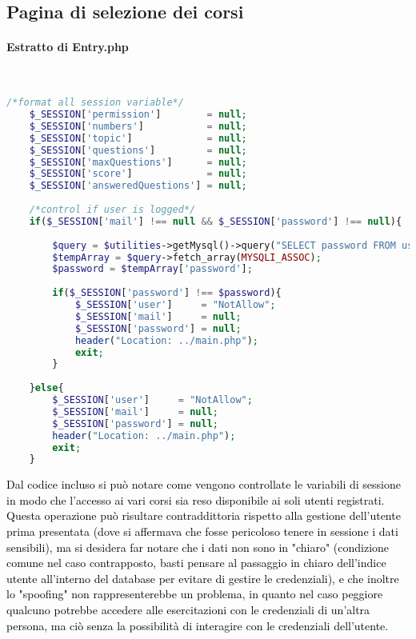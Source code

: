 
\subsection{Pagina di selezione dei corsi}

\paragraph{Estratto di Entry.php}\leavevmode\\

\begin{lstlisting}[language=php]
	/*format all session variable*/
	$_SESSION['permission']        = null;
	$_SESSION['numbers']           = null;
	$_SESSION['topic']             = null;
	$_SESSION['questions']         = null;
	$_SESSION['maxQuestions']      = null;
	$_SESSION['score']             = null;
	$_SESSION['answeredQuestions'] = null;
	
	/*control if user is logged*/
	if($_SESSION['mail'] !== null && $_SESSION['password'] !== null){
		
		$query = $utilities->getMysql()->query("SELECT password FROM user_table1 WHERE (email = '{$_SESSION['mail']}')");
		$tempArray = $query->fetch_array(MYSQLI_ASSOC);
		$password = $tempArray['password'];
		
		if($_SESSION['password'] !== $password){
			$_SESSION['user']     = "NotAllow";
			$_SESSION['mail']     = null;
			$_SESSION['password'] = null;
			header("Location: ../main.php");
			exit;
		}
		
	}else{
		$_SESSION['user']     = "NotAllow";
		$_SESSION['mail']     = null;
		$_SESSION['password'] = null;
		header("Location: ../main.php");
		exit;
	}
\end{lstlisting}

\raggedright
\textcolor{black}{Dal codice incluso si può notare come vengono controllate le variabili di sessione in modo che l'accesso ai vari corsi sia reso disponibile ai soli utenti registrati. Questa operazione può risultare contraddittoria rispetto alla gestione dell'utente prima presentata (dove si affermava che fosse pericoloso tenere in sessione i dati sensibili), ma si desidera far notare che i dati non sono in "chiaro" (condizione comune nel caso contrapposto, basti pensare al passaggio in chiaro dell'indice utente all'interno del database per evitare di gestire le credenziali), e che inoltre lo "spoofing" non rappresenterebbe un problema, in quanto nel caso peggiore qualcuno potrebbe accedere alle esercitazioni con le  credenziali di un'altra persona, ma ciò senza la possibilità di interagire con le credenziali dell'utente.}\\

